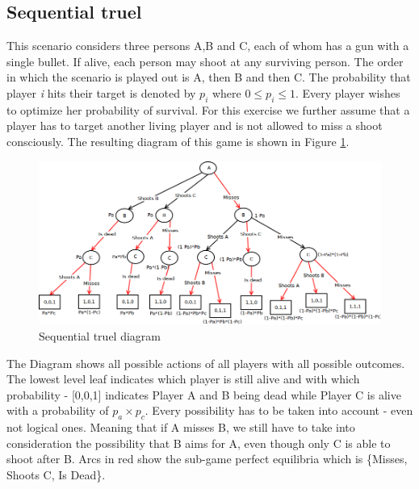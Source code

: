 \documentclass[a4paper, 11pt]{article}
\begin{document}
\newpage
\begin{landscape}
\section{Sequential truel}


This scenario considers three persons A,B and C, each of whom has a gun with a single bullet. If alive, each person may shoot at any surviving person. The order in which the scenario is played out is A, then B and then C. The probability that player \textit{i} hits their target is denoted by $p_i$ where $0\leq p_i\leq 1$. Every player wishes to optimize her probability of survival.
For this exercise we further assume that a player has to target another living player and is not allowed to miss a shoot consciously. The resulting diagram of this game is shown in Figure \ref{fig-SeqTrualDiag}.

\begin{figure}[h]
\caption{Sequential truel diagram}
\label{fig-SeqTrualDiag}
\includegraphics[scale=0.65]{SequentialTruelDiagram.png}
\end{figure}

\end{landscape}

The Diagram shows all possible actions of all players with all possible outcomes. The lowest level leaf indicates which player is still alive and with which probability - [0,0,1] indicates Player A and B being dead while Player C is alive with a probability of $p_a \times p_c$. Every possibility has to be taken into account - even not logical ones. Meaning that if A misses B, we still have to take into consideration the possibility that B aims for A, even though only C is able to shoot after B. Arcs in red show the sub-game perfect equilibria which is \{Misses, Shoots C, Is Dead\}.
\end{document}
